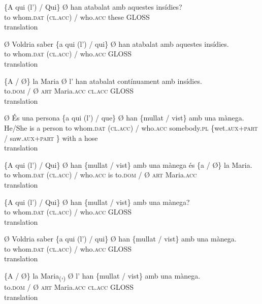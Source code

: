 \documentclass[output=paper,modfonts,nonflat,newtxmath]{langsci/langscibook}
\begin{document}
 
 \ex \label{ex:royo:16c}
 \gll \{A qui (l’) / Qui\} Ø han atabalat amb aquestes insídies?\\
to whom.\textsc{dat} (\textsc{cl.acc}) / who.\textsc{acc} these GLOSS   \\
 \glt translation
 
 \ex \label{ex:royo:16d}
 \gll Ø Voldria saber \{a qui (l’) / qui\} Ø han atabalat amb aquestes insídies.\\
 to whom.\textsc{dat} (\textsc{cl.acc}) / who.\textsc{acc} GLOSS  \\
 \glt translation
 
\ex \label{ex:royo:16e}
 \gll \{A / Ø\} la Maria Ø l’ han atabalat contínuament amb insídies.\\
 to.\textsc{dom} / Ø \textsc{art} Maria.\textsc{acc} \textsc{cl.acc} GLOSS\\
 \glt translation
 
 \z
 \z


\ea%
 \label{ex:royo:17}
 \ea \label{ex:royo:17a}
 \gll Ø És una persona \{a qui (l’) / que\} Ø han \{mullat / vist\} amb una mànega.\\
He/She is a person to whom.\textsc{dat} (\textsc{cl.acc}) / who.\textsc{acc} somebody.\textsc{pl} \{wet.\textsc{aux}+\textsc{part} / saw.\textsc{aux}+\textsc{part} \} with a hose \\
 \glt translation
 
 \ex \label{ex:royo:17b}
 \gll \{A qui (l’) / Qui\} Ø han \{mullat / vist\} amb una mànega és \{a / Ø\} la Maria.\\
 to whom.\textsc{dat} (\textsc{cl.acc}) / who.\textsc{acc} is to.\textsc{dom} / Ø \textsc{art} Maria.\textsc{acc}\\
 \glt translation
 
 \ex \label{ex:royo:17c}
 \gll \{A qui (l’) / Qui\} Ø han \{mullat / vist\} amb una mànega?\\
 to whom.\textsc{dat} (\textsc{cl.acc}) / who.\textsc{acc} GLOSS\\
 \glt translation
 
 \ex \label{ex:royo:17d}
 \gll Ø Voldria saber \{a qui (l’) / qui\} Ø han \{mullat / vist\} amb una mànega.\\
 to whom.\textsc{dat} (\textsc{cl.acc}) / who.\textsc{acc} GLOSS\\
 \glt translation
 
 \ex \label{ex:royo:17e}
 \gll \{A / Ø\} la Maria\textsubscript{(},\textsubscript{)} Ø l’ han \{mullat / vist\} amb una mànega.\\
 to.\textsc{dom} / Ø \textsc{art} Maria.\textsc{acc} \textsc{cl.acc} GLOSS\\
 \glt translation
 
\end{document}
